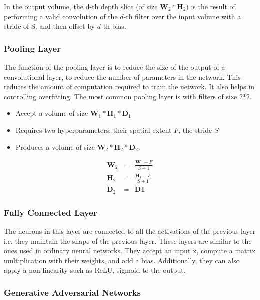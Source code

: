 \documentclass{article}
\begin{document}
In the output volume, the d-th depth slice (of size $\mathbf{W}_2 *
\mathbf{H}_2$) is the result of performing a valid convolution of the $d$-th
filter over the input volume with a stride of S, and then offset by $d$-th bias.

\subsubsection{Pooling Layer}

The function of the pooling layer is to reduce the size of the output of a convolutional layer, to
reduce the number of parameters in the network. This reduces the amount of computation required to
train the network. It also helps in controlling overfitting. The most common pooling layer is with
filters of size 2*2.

\begin{itemize}
  \item Accept a volume of size $\mathbf{W}_1 * \mathbf{H}_1 * \mathbf{D}_1$
  \item Requires two hyperparameters: their spatial extent $F$, the stride $S$
  \item Produces a volume of size $\mathbf{W}_2 * \mathbf{H}_2 * \mathbf{D}_2$.
\end{itemize}

\begin{eqnarray} \nonumber
  \mathbf{W}_2 & = & \frac{\mathbf{W}_1 - F}{S + 1} \\ \nonumber
  \mathbf{H}_2 & = & \frac{\mathbf{H}_1 - F}{S + 1} \\ \nonumber
  \mathbf{D}_2 & = & \mathbf{D1} \nonumber
\end{eqnarray}

\subsubsection{Fully Connected Layer}
The neurons in this layer are connected to all the activations of the previous
layer i.e. they maintain the shape of the previous layer. These layers are
similar to the ones used in ordinary neural networks. They accept an input x,
compute a matrix multiplication with their weights, and add a bias. Additionally,
they can also apply a non-linearity such as ReLU, sigmoid to the output.

\subsubsection{Generative Adversarial Networks}
\end{document}
